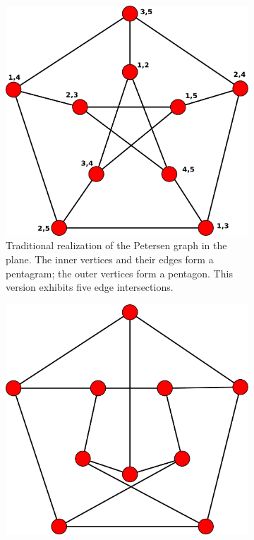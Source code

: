 \documentclass[12pt,            %
               a4paper,         %
               oneside,         %
               DIV12,           %
               fleqn,           %
               halfparskip,     %
               nochapterprefix, %
              ]{scrartcl} %
\theoremstyle{definition}
\begin{document}
\begin{figure}[p]
  \begin{subfigure}[t]{.45\textwidth}
    \centering
    \includegraphics[keepaspectratio=true,width=\textwidth]{../planar-graphs/petersen-grundlage.pdf}
    \caption{Traditional realization of the Petersen graph in the plane.
      The inner vertices and their edges form a pentagram; the outer
      vertices form a pentagon. This version exhibits five edge
      intersections.}
    \label{fig:petersen}
  \end{subfigure}\hfill
  \begin{subfigure}[t]{.45\textwidth}
    \centering
    \includegraphics[keepaspectratio=true,width=\textwidth]{../planar-graphs/petersen-zweikreuzungen.pdf}

\end{subfigure}
\end{figure}
\end{document}
